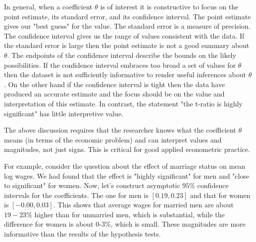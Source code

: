 \documentclass[10pt]{article}
\begin{document}
In general, when a coefficient $\theta$ is of interest it is constructive to focus on the point estimate, its standard error, and its confidence interval. The point estimate gives our "best guess" for the value. The standard error is a measure of precision. The confidence interval gives us the range of values consistent with the data. If the standard error is large then the point estimate is not a good summary about $\theta$. The endpoints of the confidence interval describe the bounds on the likely possibilities. If the confidence interval embraces too broad a set of values for $\theta$ then the dataset is not sufficiently informative to render useful inferences about $\theta$. On the other hand if the confidence interval is tight then the data have produced an accurate estimate and the focus should be on the value and interpretation of this estimate. In contrast, the statement "the t-ratio is highly significant" has little interpretive value.

The above discussion requires that the researcher knows what the coefficient $\theta$ means (in terms of the economic problem) and can interpret values and magnitudes, not just signs. This is critical for good applied econometric practice.

For example, consider the question about the effect of marriage status on mean log wages. We had found that the effect is "highly significant" for men and "close to significant" for women. Now, let's construct asymptotic $95 \%$ confidence intervals for the coefficients. The one for men is $[0.19,0.23]$ and that for women is $[-0.00,0.03]$. This shows that average wages for married men are about $19-23 \%$ higher than for unmarried men, which is substantial, while the difference for women is about 0-3\%, which is small. These magnitudes are more informative than the results of the hypothesis tests.
\end{document}
